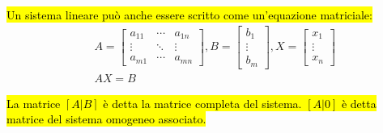 \hl{Un sistema lineare può anche essere scritto come un'equazione matriciale:}
\begin{align*}
    & A =
    \begin{bmatrix}
        a_{11} & \cdots & a_{1n} \\
        \vdots & \ddots & \vdots \\
        a_{m1} & \cdots & a_{mn}
    \end{bmatrix}, B =
    \begin{bmatrix}
        b_1 \\ \vdots \\ b_m
    \end{bmatrix}, X =
    \begin{bmatrix}
        x_1 \\ \vdots \\ x_n
    \end{bmatrix} \\
    & AX = B
\end{align*}

\hl{La matrice $[A|B]$ è detta la matrice completa del sistema. $[A|0]$ è detta
matrice del sistema omogeneo associato.}

